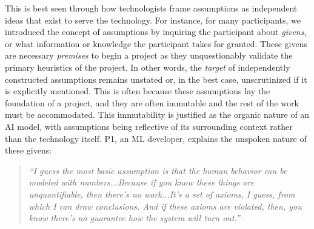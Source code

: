 This is best seen through how technologists frame assumptions as independent ideas that exist to serve the technology. For instance, for many participants, we introduced the concept of assumptions by inquiring the participant about \textit{givens}, or what information or knowledge the participant takes for granted. These givens are necessary \textit{premises} to begin a project as they unquestionably validate the primary heuristics of the project. In other words, the \textit{target} of independently constructed assumptions remains unstated or, in the best case, unscrutinized if it is explicitly mentioned. This is often because these assumptions lay the foundation of a project, and they are often immutable and the rest of the work must be accommodated. This immutability is justified as the organic nature of an AI model, with assumptions being reflective of its surrounding context rather than the technology itself. P1, an ML developer, explains the unspoken nature of these givens:

\begin{quote}
\textit{``I guess the most basic assumption is that the human behavior can be modeled with numbers...Because if you know these things are unquantifiable, then there’s no work...It's a set of axioms, I guess, from which I can draw conclusions. And if these axioms are violated, then, you know there’s no guarantee how the system will turn out.''} 
\end{quote}


